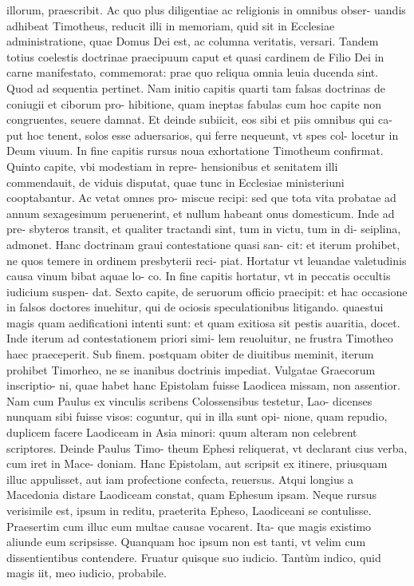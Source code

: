 \documentclass{article}
\begin{document}
\begin{pages}
illorum, praescribit. Ac quo plus diligentiae ac religionis in omnibus obser- uandis adhibeat Timotheus, reducit illi in memoriam, quid sit in Ecclesiae administratione, quae Domus Dei est, ac columna veritatis, versari. Tandem totius coelestis doctrinae praecipuum caput et quasi cardinem de Filio Dei in carne manifestato, commemorat: prae quo reliqua omnia leuia ducenda sint. Quod ad sequentia pertinet. Nam initio capitis quarti tam falsas doctrinas de coniugii et ciborum pro- hibitione, quam ineptas fabulas cum hoc capite non congruentes, seuere damnat. Et deinde subiicit, eos sibi et piis omnibus qui ca- put hoc tenent, solos esse aduersarios, qui ferre nequeunt, vt spes col- locetur in Deum viuum. In fine capitis rursus noua exhortatione Timotheum confirmat. Quinto capite, vbi modestiam in repre- hensionibus et senitatem illi commendauit, de viduis disputat, quae tunc in Ecclesiae ministeriuni cooptabantur. Ac vetat omnes pro- miscue recipi: sed que tota vita probatae ad annum sexagesimum peruenerint, et nullum habeant onus domesticum. Inde ad pre- sbyteros transit, et qualiter tractandi sint, tum in victu, tum in di- seiplina, admonet. Hanc doctrinam graui contestatione quasi san- cit: et iterum prohibet, ne quos temere in ordinem presbyterii reci- piat. Hortatur vt leuandae valetudinis causa vinum bibat aquae lo- co. In fine capitis hortatur, vt in peccatis occultis iudicium suspen- dat. Sexto capite, de seruorum officio praecipit: et hac occasione in falsos doctores inuehitur, qui de ociosis speculationibus litigando. quaestui magis quam aedificationi intenti sunt: et quam exitiosa sit pestis auaritia, docet. Inde iterum ad contestationem priori simi- lem reuoluitur, ne frustra Timotheo haec praeceperit. Sub finem. postquam obiter de diuitibus meminit, iterum prohibet Timorheo, ne se inanibus doctrinis impediat. Vulgatae Graecorum inscriptio- ni, quae habet hanc Epistolam fuisse Laodicea missam, non assentior. Nam cum Paulus ex vinculis scribens Colossensibus testetur, Lao- dicenses nunquam sibi fuisse visos: coguntur, qui in illa sunt opi- nione, quam repudio, duplicem facere Laodiceam in Asia minori: quum alteram non celebrent scriptores. Deinde Paulus Timo- theum Ephesi reliquerat, vt declarant cius verba, cum iret in Mace- doniam. Hanc Epistolam, aut scripsit ex itinere, priusquam illuc  \pend\pstart appulisset, aut iam profectione confecta, reuersus. Atqui longius a Macedonia distare Laodiceam constat, quam Ephesum ipsam. Neque rursus verisimile est, ipsum in reditu, praeterita Epheso, Laodiceani se contulisse. Praesertim cum illuc eum multae causae vocarent. Ita- que magis existimo aliunde eum scripsisse. Quanquam hoc ipsum non est tanti, vt velim cum dissentientibus contendere. Fruatur quisque suo iudicio. Tantùm indico, quid magis iit, meo iudicio, probabile.  \pend
{}
{}

\end{pages}
\end{document}
